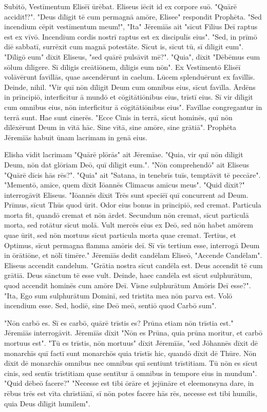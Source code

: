 Subitō, Vestīmentum Elisēī ūrēbat. Eliseus iēcit id ex corpore suō. "Quārē accidit!?". "Deus dīligit tē cum permagnā amōre, Elisee" respondit Prophēta. "Sed incendium cēpit vestīmentum meum!", "Ita" Jēremīās ait "sīcut Fīlius Deī raptus est ex vīvō. Incendium cordis nostrī raptus est ex discipulīs eius". "Sed, in prīmō diē sabbatī, surrēxit cum magnā potestāte. Sīcut is, sīcut tū, sī dīligit eum". "Dīligō eum" dīxit Eliseus, "sed quārē pulsāvit mē?". "Quia", dīxit "Dēbēmus eum sōlum dīligere. Sī dīligis creātiōnem, dīligis eum nōn".  
Ex Vestīmentō Elisēī volāvērunt favīllās, quae ascendērunt in caelum. Lūcem splenduērunt ex favīllīs. Deinde, nihil. "Vir quī nōn dīligit Deum cum omnibus eius, sīcut favīlla. Ārdēns in prīncipiō, interficitur ā mundō et cōgitātiōnibus eius, trīstī eius. Sī vir dīligit cum omnibus eius, nōn interficitur ā cōgitātiōnibus eius". Favīllae congregantur in terrā sunt. Hae sunt cinerēs. "Ecce Cinis in terrā, sīcut hominēs, quī nōn dīlēxērunt Deum in vītā hāc. Sine vītā, sine amōre, sine grātiā". Prophēta Jēremīās habuit ūnam lacrimam in genā eius. \par 
Elisha vīdit lacrimam "Quārē plōrās" ait Jēremīae. "Quia, vir quī nōn dīligit Deum, nōn dat glōriam Deō, quī dīligit eum.". "Nōn comprehendō" ait Eliseus "Quārē dīcis hās rēs?". "Quia" ait "Satana, in tenebrīs tuīs, temptāvit tē peccāre". "Mementō, amīce, quem dīxit Iōannēs Climacus amīcus meus". "Quid dīxit?" interrogāvit Eliseus. "Iōannēs dīxit \: Trēs sunt speciēī quī concurrent ad Deum. Prīmus, sīcut Thūs quod ūrit. Odor eius bonus in prīncipiō, sed cremat. Particula morta fit, quandō cremat et nōn ārdet. Secundum nōn cremat, sīcut particulā morta, sed rotātur sīcut molā. Vult mercēs eius ex Deō, sed nōn habet amōrem quae ūrit, sed nōn mortuus sīcut particula morta quae cremat. Tertius, et Optimus, sīcut permagna flamma amōris deī. Sī vīs tertium esse, interrogā Deum in ōrātiōne, et nōlī timēre." Jēremīās dedit candēlam Eliseō, "Accende Candēlam". Eliseus accendit candelum. "Grātia nostra sīcut candēla est. Deus accendit tē cum grātiā. Deus sānctum tē esse vult. Deinde, haec candēla est sīcut sulphurātum, quod accendit hominēs cum amōre Deī. Vīsne sulphurātum Amōris Deī esse?". "Ita, Ego sum sulphurātum Dominī, sed tristita mea nōn parva est. Volō incendium esse. Sed, hodiē, sine Deō meō, sentiō quod Carbō sum".\par
"Nōn carbō es. Sī es carbō, quārē trīstis es? Prūna etiam nōn trīstia est." Jēremīās interrogāvit. Jēremīās dīxit "Nōn es Prūna, quia prūna moritur, et carbō mortuus est". "Tū es trīstis, nōn mortuus" dīxit Jēremīās, "sed Jōhannēs dīxit dē monarchīs quī factī sunt monarchōs quia trīstīs hic, quandō dīxit dē Thūre. Nōn dīxit dē monarchīs omnibus nec omnibus quī sentiunt trīstitiam. Tū nōn es sīcut cinis, sed sentīs trīstitiam quae sentītur ā omnibus in tempore eius in mundum". "Quid dēbeō facere?" "Necesse est tibi ōrāre et jejūnāre et eleemonsyna dare, in rēbus trēs est vīta chrīstiānī, sī nōn potes facere hās rēs, necesse est tibi humilis, quia Deus dīligit humilem".\par 
